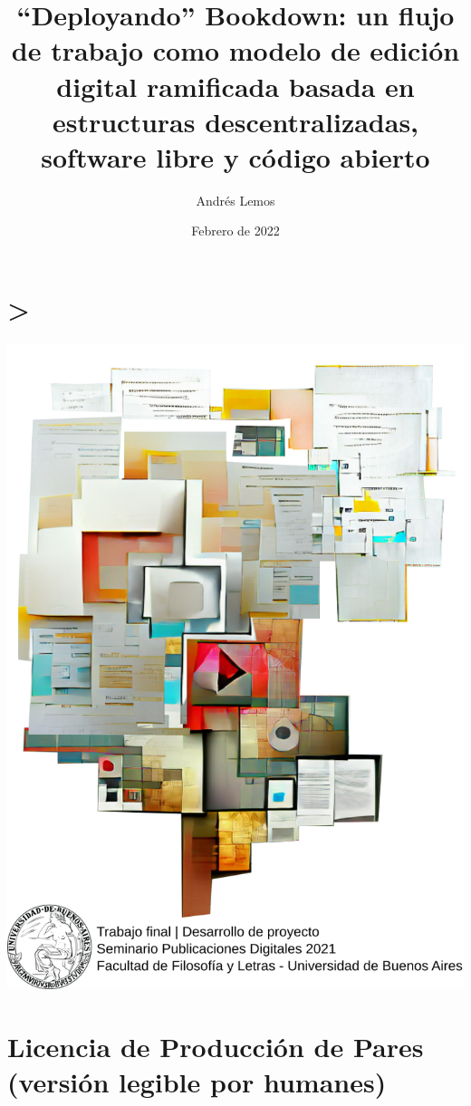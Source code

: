 \documentclass[
]{krantz}
\title{``Deployando'' Bookdown: un flujo de trabajo como modelo de edición digital ramificada basada en estructuras descentralizadas, software libre y código abierto}
\author{Andrés Lemos}
\date{Febrero de 2022}
\begin{document}
\maketitle

{
\hypersetup{linkcolor=}
\setcounter{tocdepth}{1}
\tableofcontents
}
\hypertarget{section}{%
\chapter*{\textgreater{}}\label{section}}


\includegraphics{images/portada.png}

\hypertarget{licencias}{%
\chapter*{Licencia de Producción de Pares (versión legible por humanes)}\label{licencias}}
\end{document}
